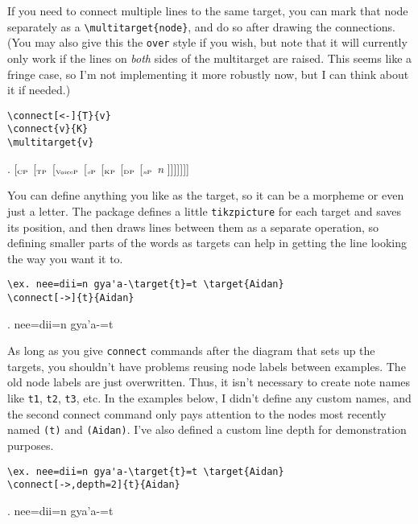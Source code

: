 \documentclass{article}
\newcommand{\subsc}[1]{$_{\textrm{\tiny #1}}$}
\begin{document}


If you need to connect multiple lines to the same target, you can mark that node separately as a \verb;\multitarget{node};, and do so after drawing the connections. (You may also give this the \verb;over; style if you wish, but note that it will currently only work if the lines on \textit{both} sides of the multitarget are raised. This seems like a fringe case, so I'm not implementing it more robustly now, but I can think about it if needed.)

\begin{verbatim}
\connect[<-]{T}{v}
\connect{v}{K}
\multitarget{v}
\end{verbatim}

\ex.	[\subsc{CP} [\subsc{TP}  [\subsc{VoiceP}  [\subsc{\textit{v}P}  [\subsc{KP}  [\subsc{DP}  [\subsc{\textit{n}P} \textit{n} ]]]]]]]



You can define anything you like as the target, so it can be a morpheme or even just a letter. The package defines a little \texttt{tikzpicture} for each target and saves its position, and then draws lines between them as a separate operation, so defining smaller parts of the words as targets can help in getting the line looking the way you want it to.

\begin{verbatim}
\ex. nee=dii=n gya'a-\target{t}=t \target{Aidan}
\connect[->]{t}{Aidan}
\end{verbatim}

\ex. nee=dii=n gya'a-=t 



As long as you give \texttt{connect} commands after the diagram that sets up the targets, you shouldn't have problems reusing node labels between examples. The old node labels are just overwritten. Thus, it isn't necessary to create note names like \texttt{t1}, \texttt{t2}, \texttt{t3}, etc. In the examples below, I didn't define any custom names, and the second connect command only pays attention to the nodes most recently named \texttt{(t)} and \texttt{(Aidan)}. I've also defined a custom line depth for demonstration purposes.

\begin{verbatim}
\ex. nee=dii=n gya'a-\target{t}=t \target{Aidan}
\connect[->,depth=2]{t}{Aidan}
\end{verbatim}

\ex. nee=dii=n gya'a-=t 

\end{document}
